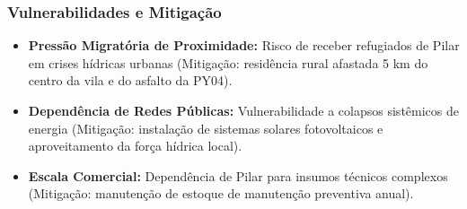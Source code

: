 \subsubsection{Vulnerabilidades e
Mitigação}

\begin{itemize}
\tightlist
\item
  \textbf{Pressão Migratória de Proximidade:} Risco de receber
  refugiados de Pilar em crises hídricas urbanas (Mitigação: residência
  rural afastada 5 km do centro da vila e do asfalto da PY04).
\item
  \textbf{Dependência de Redes Públicas:} Vulnerabilidade a colapsos
  sistêmicos de energia (Mitigação: instalação de sistemas solares
  fotovoltaicos e aproveitamento da força hídrica local).
\item
  \textbf{Escala Comercial:} Dependência de Pilar para insumos técnicos
  complexos (Mitigação: manutenção de estoque de manutenção preventiva
  anual).
\end{itemize}

